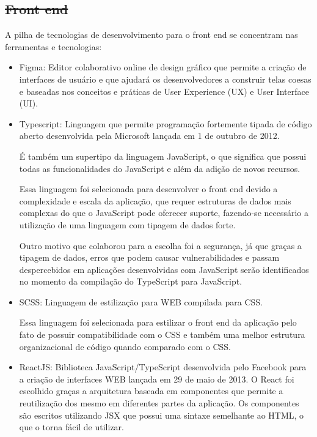 \documentclass[
    12pt,               %
    openright,          %
    oneside,
    a4paper,            %
    BIBLATEX,           %
    TODO,               %
    english,            %
    brazil              %
    ]{ifsp-spo-inf-ctds}
\providecommand{\DIFadd}[1]{{\protect\color{blue}\uwave{#1}}} %
\providecommand{\DIFdel}[1]{{\protect\color{red}\sout{#1}}}                      %
\providecommand{\DIFaddbegin}{} %
\providecommand{\DIFaddend}{} %
\providecommand{\DIFdelbegin}{} %
\providecommand{\DIFdelend}{} %
\newcommand{\DIFscaledelfig}{0.5}
\newlength{\DIFdelgraphicswidth} %
\newlength{\DIFdelgraphicsheight} %
\newcommand{\DIFaddincludegraphics}[2][]{{\color{blue}\fbox{\DIFOincludegraphics[#1]{#2}}}} %
\newcommand{\DIFdelincludegraphics}[2][]{%
\sbox{\DIFdelgraphicsbox}{\DIFOincludegraphics[#1]{#2}}%
\settoboxwidth{\DIFdelgraphicswidth}{\DIFdelgraphicsbox} %
\settoboxtotalheight{\DIFdelgraphicsheight}{\DIFdelgraphicsbox} %
\scalebox{\DIFscaledelfig}{%
\parbox[b]{\DIFdelgraphicswidth}{\usebox{\DIFdelgraphicsbox}\\[-\baselineskip] \rule{\DIFdelgraphicswidth}{0em}}\llap{\resizebox{\DIFdelgraphicswidth}{\DIFdelgraphicsheight}{%
\setlength{\unitlength}{\DIFdelgraphicswidth}%
\begin{picture}(1,1)%
\thicklines\linethickness{2pt} %
{\color[rgb]{1,0,0}\put(0,0){\framebox(1,1){}}}%
{\color[rgb]{1,0,0}\put(0,0){\line( 1,1){1}}}%
{\color[rgb]{1,0,0}\put(0,1){\line(1,-1){1}}}%
\end{picture}%
}\hspace*{3pt}}} %
} %
\DeclareRobustCommand{\DIFaddbegin}{\DIFOaddbegin \let\includegraphics\DIFaddincludegraphics} %
\DeclareRobustCommand{\DIFaddend}{\DIFOaddend \let\includegraphics\DIFOincludegraphics} %
\DeclareRobustCommand{\DIFdelbegin}{\DIFOdelbegin \let\includegraphics\DIFdelincludegraphics} %
\DeclareRobustCommand{\DIFdelend}{\DIFOaddend \let\includegraphics\DIFOincludegraphics} %
\begin{document}
    \subsection{\DIFdelbegin \DIFdel{Front end}\DIFdelend \DIFaddbegin \DIFadd{Front-end}\DIFaddend }

        A pilha de tecnologias de desenvolvimento para o front end se concentram nas ferramentas e tecnologias:

        \begin{itemize}

            \item Figma: Editor colaborativo online de design gráfico que permite a criação de interfaces de usuário e que ajudará os desenvolvedores a construir telas coesas e baseadas nos conceitos e práticas de User Experience (UX) e User Interface (UI).

            \item Typescript:
                Linguagem que permite programação fortemente tipada de código aberto desenvolvida pela Microsoft lançada em 1 de outubro de 2012. 

                É também um supertipo da linguagem  JavaScript, o que significa que possui todas as funcionalidades do JavaScript e além da adição de novos recursos. 

                Essa linguagem foi selecionada para desenvolver o front end devido a complexidade e escala da aplicação, que requer estruturas de dados mais complexas do que o JavaScript pode oferecer suporte, fazendo-se necessário a utilização de uma linguagem com tipagem de dados forte. 

                Outro motivo que colaborou para a escolha foi a segurança, já que graças a tipagem de dados, erros que podem causar vulnerabilidades e passam despercebidos em aplicações desenvolvidas com JavaScript serão identificados no momento da compilação do TypeScript para JavaScript.

            \item SCSS:
                Linguagem de estilização para WEB compilada para CSS.

                Essa linguagem foi selecionada para estilizar o front end da aplicação pelo fato de possuir compatibilidade com o CSS e também uma melhor estrutura organizacional de código quando comparado com o CSS.

            \item ReactJS:
                Biblioteca JavaScript/TypeScript desenvolvida pelo Facebook para a criação de interfaces WEB lançada em 29 de maio de 2013. O React foi escolhido graças a arquitetura baseada em componentes que permite a reutilização dos mesmo em diferentes partes da aplicação. Os componentes são escritos utilizando JSX que possui uma sintaxe semelhante ao HTML, o que o torna fácil de utilizar.


\end{itemize}
\end{document}
